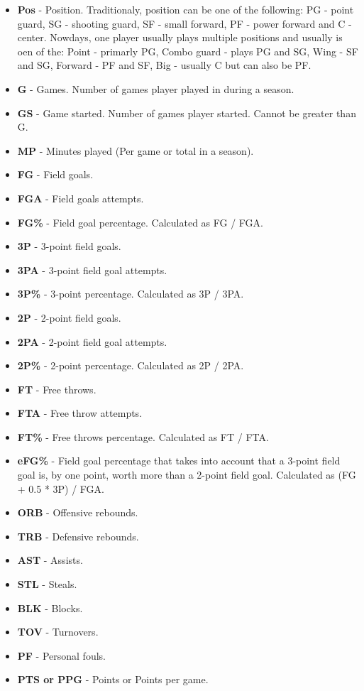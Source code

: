 \documentclass[a4paper]{article}
\begin{document}
\begin{itemize}
	\item \textbf{Pos} - Position. Traditionaly, position can be one of the following: PG - point guard, SG - shooting guard, SF - small forward, PF - power forward and C - center. Nowdays, one player usually plays multiple positions and usually is oen of the: Point - primarly PG, Combo guard - plays PG and SG, Wing - SF and SG, Forward - PF and SF, Big - usually C but can also be PF.
	\item \textbf{G} - Games. Number of games player played in during a season.
	\item \textbf{GS} - Game started. Number of games player started. Cannot be greater than G.
	\item \textbf{MP} - Minutes played (Per game or total in a season).
	\item \textbf{FG} - Field goals.
	\item \textbf{FGA} - Field goals attempts.
	\item \textbf{FG\%} - Field goal percentage. Calculated as FG / FGA.
	\item \textbf{3P} - 3-point field goals.
	\item \textbf{3PA} - 3-point field goal attempts.
	\item \textbf{3P\%} - 3-point percentage. Calculated as 3P / 3PA.
	\item \textbf{2P} - 2-point field goals. 
	\item \textbf{2PA} - 2-point field goal attempts.
	\item \textbf{2P\%} - 2-point percentage. Calculated as 2P / 2PA.
	\item \textbf{FT} - Free throws.
	\item \textbf{FTA} - Free throw attempts.
	\item \textbf{FT\%} - Free throws percentage. Calculated as FT / FTA.
	\item \textbf{eFG\%} - Field goal percentage that takes into account that a 3-point field goal is, by one point, worth more than a 2-point field goal. Calculated as (FG + 0.5 * 3P) / FGA.
	\item \textbf{ORB} - Offensive rebounds.
	\item \textbf{TRB} - Defensive rebounds.
	\item \textbf{AST} - Assists.
	\item \textbf{STL} - Steals.
	\item \textbf{BLK} - Blocks.
	\item \textbf{TOV} - Turnovers.
	\item \textbf{PF} - Personal fouls.
	\item \textbf{PTS or PPG} - Points or Points per game.	
\end{itemize}	
	
\end{document}
